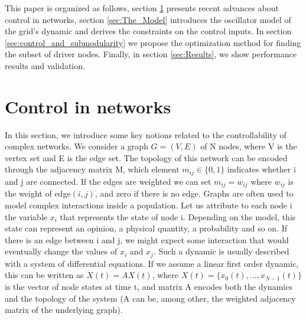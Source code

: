 \documentclass[conference]{IEEEtran}
\begin{document}

This paper is organized as follows, section \ref{sec:control} presents recent advances about control in networks, section \ref{sec:The_Model} introduces the oscillator model of the grid's dynamic and derives the constraints on the control inputs. In section \ref{sec:control_and_submodularity} we propose the optimization method for finding the subset of driver nodes. Finally, in section \ref{sec:Results}, we show performance results and validation.



\section{Control in networks}
\label{sec:control}

In this section, we introduce some key notions related to the controllability of complex networks. We consider a graph $G=(V,E)$ of N nodes, where V is the vertex set and E is the edge set. The topology of this network can be encoded through the adjacency matrix M, which element $m_{ij} \in \{0,1\}$ indicates whether i and j are connected. If the edges are weighted we can set $m_{ij} = w_{ij}$ where $w_{ij}$ is the weight of edge$(i,j)$, and zero if there is no edge. Graphs are often used to model complex interactions inside a population. Let us attribute to each node i the variable $ x_i $ that represents the state of node i. Depending on the model, this state can represent an opinion, a physical quantity, a probability and so on. If there is an edge between i and j, we might expect some interaction that would eventually change the values of $x_i$ and $x_j$. Such a dynamic is usually described with a system of differential equations. If we assume a linear first order dynamic, this can be written as $ \dot{X}(t) = A X(t) $, where $X(t)=\{x_0(t),...,x_{N-1}(t)\}$ is the vector of node states at time t, and matrix A encodes both the dynamics and the topology of the system (A can be, among other, the weighted adjacency matrix of the underlying graph).
\end{document}
